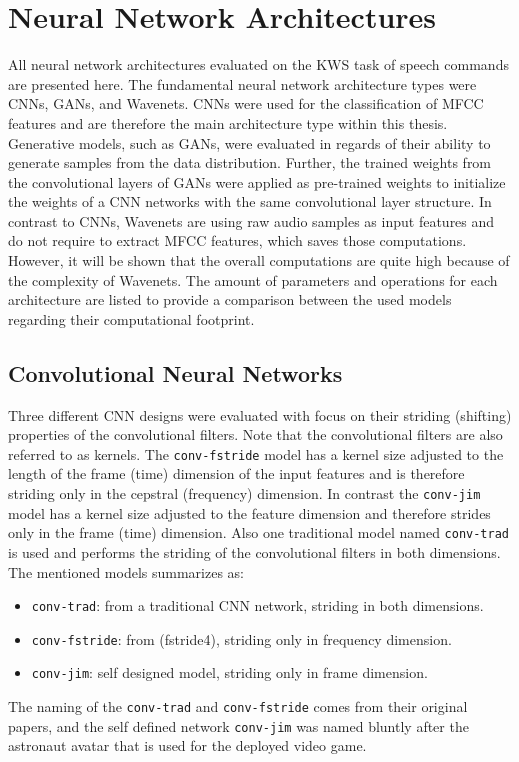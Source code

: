 
\section{Neural Network Architectures}\label{sec:nn_arch}
All neural network architectures evaluated on the KWS task of speech commands are presented here.
The fundamental neural network architecture types were CNNs, GANs, and Wavenets.
CNNs were used for the classification of MFCC features and are therefore the main architecture type within this thesis.
Generative models, such as GANs, were evaluated in regards of their ability to generate samples from the data distribution.
Further, the trained weights from the convolutional layers of GANs were applied as pre-trained weights to initialize the weights of a CNN networks with the same convolutional layer structure.
In contrast to CNNs, Wavenets are using raw audio samples as input features and do not require to extract MFCC features, which saves those computations.
However, it will be shown that the overall computations are quite high because of the complexity of Wavenets.
The amount of parameters and operations for each architecture are listed to provide a comparison between the used models regarding their computational footprint.



\subsection{Convolutional Neural Networks}\label{sec:nn_arch_cnn}
Three different CNN designs were evaluated with focus on their striding (shifting) properties of the convolutional filters.
Note that the convolutional filters are also referred to as kernels.
The \texttt{conv-fstride} model has a kernel size adjusted to the length of the frame (time) dimension of the input features and is therefore striding only in the cepstral (frequency) dimension.
In contrast the \texttt{conv-jim} model has a kernel size adjusted to the feature dimension and therefore strides only in the frame (time) dimension.
Also one traditional model named \texttt{conv-trad} is used and performs the striding of the convolutional filters in both dimensions.
The mentioned models summarizes as:
\begin{itemize}
	\item \texttt{conv-trad}: from \cite{Sainath2015} a traditional CNN network, striding in both dimensions.
	\item \texttt{conv-fstride}: from \cite{Sainath2015} (fstride4), striding only in frequency dimension.
	\item \texttt{conv-jim}: self designed model, striding only in frame dimension.
\end{itemize}
The naming of the \texttt{conv-trad} and \texttt{conv-fstride} comes from their original papers, and the self defined network \texttt{conv-jim} was named bluntly after the astronaut avatar that is used for the deployed video game.

